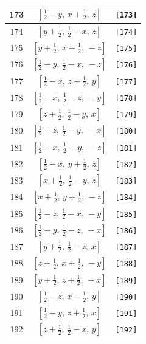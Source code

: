 \documentclass[fleqn,8pt]{jsarticle}
\begin{document}
\begin{longtable}{ccc}
173 & $\left[ \frac{1}{2} - y,\, x + \frac{1}{2},\, z \right]$ & {\tt [173]} \\ \hline
174 & $\left[ y + \frac{1}{2},\, \frac{1}{2} - x,\, z \right]$ & {\tt [174]} \\ \hline
175 & $\left[ y + \frac{1}{2},\, x + \frac{1}{2},\, - z \right]$ & {\tt [175]} \\ \hline
176 & $\left[ \frac{1}{2} - y,\, \frac{1}{2} - x,\, - z \right]$ & {\tt [176]} \\ \hline
177 & $\left[ \frac{1}{2} - x,\, z + \frac{1}{2},\, y \right]$ & {\tt [177]} \\ \hline
178 & $\left[ \frac{1}{2} - x,\, \frac{1}{2} - z,\, - y \right]$ & {\tt [178]} \\ \hline
179 & $\left[ z + \frac{1}{2},\, \frac{1}{2} - y,\, x \right]$ & {\tt [179]} \\ \hline
180 & $\left[ \frac{1}{2} - z,\, \frac{1}{2} - y,\, - x \right]$ & {\tt [180]} \\ \hline
181 & $\left[ \frac{1}{2} - x,\, \frac{1}{2} - y,\, - z \right]$ & {\tt [181]} \\ \hline
182 & $\left[ \frac{1}{2} - x,\, y + \frac{1}{2},\, z \right]$ & {\tt [182]} \\ \hline
183 & $\left[ x + \frac{1}{2},\, \frac{1}{2} - y,\, z \right]$ & {\tt [183]} \\ \hline
184 & $\left[ x + \frac{1}{2},\, y + \frac{1}{2},\, - z \right]$ & {\tt [184]} \\ \hline
185 & $\left[ \frac{1}{2} - z,\, \frac{1}{2} - x,\, - y \right]$ & {\tt [185]} \\ \hline
186 & $\left[ \frac{1}{2} - y,\, \frac{1}{2} - z,\, - x \right]$ & {\tt [186]} \\ \hline
187 & $\left[ y + \frac{1}{2},\, \frac{1}{2} - z,\, x \right]$ & {\tt [187]} \\ \hline
188 & $\left[ z + \frac{1}{2},\, x + \frac{1}{2},\, - y \right]$ & {\tt [188]} \\ \hline
189 & $\left[ y + \frac{1}{2},\, z + \frac{1}{2},\, - x \right]$ & {\tt [189]} \\ \hline
190 & $\left[ \frac{1}{2} - z,\, x + \frac{1}{2},\, y \right]$ & {\tt [190]} \\ \hline
191 & $\left[ \frac{1}{2} - y,\, z + \frac{1}{2},\, x \right]$ & {\tt [191]} \\ \hline
192 & $\left[ z + \frac{1}{2},\, \frac{1}{2} - x,\, y \right]$ & {\tt [192]} \\
\end{longtable}
\end{document}
